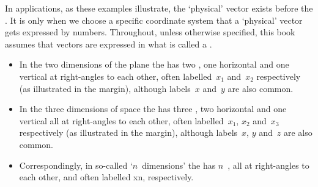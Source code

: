 In applications, as these examples illustrate, the `physical' vector exists before the .
It is only when we choose a specific coordinate system that a `physical' vector gets expressed by numbers.
Throughout, unless otherwise specified, this book assumes that vectors are expressed in what is called a .
\begin{itemize}
\item In the two dimensions of the plane the  has two , 
%
one horizontal and one vertical at right-angles to each other, often labelled~\(x_1\) and~\(x_2\) respectively (as illustrated in the margin), although labels~\(x\) and~\(y\) are also common.%

\item In the three dimensions of space the  has three , 
%
two horizontal and one vertical all at right-angles to each other, often labelled~\(x_1\), \(x_2\) and~\(x_3\) respectively (as illustrated in the margin), although labels~\(x\), \(y\) and~\(z\) are also common.

\item Correspondingly, in so-called `\(n\)~dimensions' the  has \(n\)~, all at right-angles to each other, and often labelled \hlist xn, respectively.
\end{itemize}




